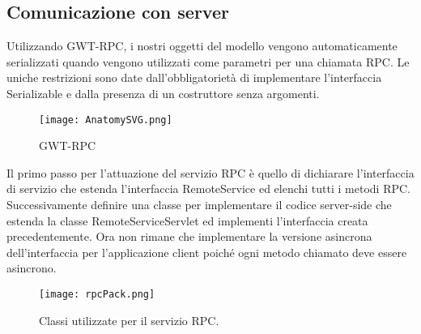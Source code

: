 \subsection{Comunicazione con server}
\FloatBarrier
Utilizzando GWT-RPC, i nostri oggetti del modello vengono automaticamente serializzati quando vengono utilizzati come parametri per una chiamata RPC. Le uniche restrizioni sono date dall’obbligatorietà di implementare 
l’interfaccia Serializable e dalla presenza di un costruttore senza argomenti. 

\begin{figure}[!htb]
\centering%
\texttt{[image: AnatomySVG.png]}%
\caption{GWT-RPC }\label{fig:GWT-RPC}%
\end{figure}
\FloatBarrier
Il primo passo per l’attuazione del servizio RPC è quello di dichiarare l’interfaccia di servizio che estenda l’interfaccia RemoteService ed elenchi tutti i metodi RPC.
Successivamente definire una classe per implementare il codice server-side che estenda la classe RemoteServiceServlet ed implementi l’interfaccia creata precedentemente. 
Ora non rimane che implementare la versione asincrona dell'interfaccia per l’applicazione client poiché ogni metodo chiamato deve essere asincrono.

\begin{figure}[!htb]
\centering%
\texttt{[image: rpcPack.png]}%
\caption{Classi utilizzate per il servizio RPC. }\label{fig:RPCPack}%
\end{figure}